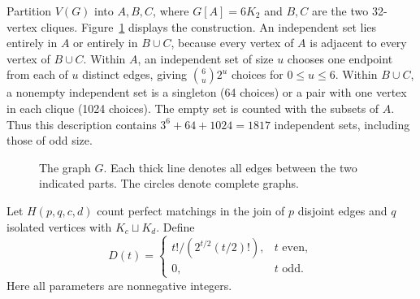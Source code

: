 \documentclass[11pt]{article}
\begin{document}
Partition $V(G)$ into $A,B,C$, where $G[A]=6K_2$ and $B,C$ are the
two 32-vertex cliques. Figure~\ref{fig:graph} displays the construction.
An independent set lies entirely in $A$ or entirely in $B\cup C$,
because every vertex of $A$ is adjacent to every vertex of $B\cup C$.
Within $A$, an independent set of size $u$ chooses one endpoint from
each of $u$ distinct edges, giving $\binom6u2^u$ choices for $0\leq u\leq6$.
Within $B\cup C$, a nonempty independent set is a singleton (64 choices)
or a pair with one vertex in each clique (1024 choices). The empty set
is counted with the subsets of $A$. Thus this description contains
$3^6+64+1024=1817$ independent sets, including those of odd size.

\begin{figure}[ht]
\centering
{}
\caption{The graph $G$. Each thick line denotes all edges between
the two indicated parts. The circles denote complete graphs.}
\label{fig:graph}
\end{figure}

Let $H(p,q,c,d)$ count perfect matchings in the join of $p$ disjoint
edges and $q$ isolated vertices with $K_c\sqcup K_d$.
Define
\[
D(t)=\begin{cases}t!/(2^{t/2}(t/2)!),&t\text{ even},\\0,&t\text{ odd}.
\end{cases}
\]
Here all parameters are nonnegative integers.
\end{document}
